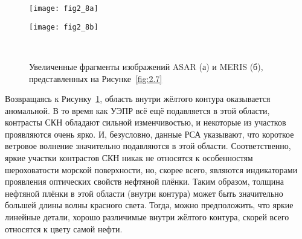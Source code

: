 \begin{figure}[!ht]
   	\centering
	\begin{minipage}{.49\textwidth}
	    \subcaptionbox{\label{fig:2.8a}}
		{\texttt{[image: fig2\_8a]}}
	\end{minipage}
	\hfill
	\begin{minipage}{.49\textwidth}
	    \subcaptionbox{\label{fig:2.8b}}
		{\texttt{[image: fig2\_8b]}}
	\end{minipage}
    \\
    \caption{Увеличенные фрагменты изображений ASAR (а) и MERIS (б), представленных на Рисунке~\ref{fig:2.7}}
    \label{fig:2.8}
\end{figure}


Возвращаясь к Рисунку~\ref{fig:2.8}, область внутри жёлтого контура оказывается аномальной. В то время как УЭПР всё ещё подавляется в этой области, контрасты СКН обладают сильной изменчивостью, и некоторые из участков проявляются очень ярко. И, безусловно, данные РСА указывают, что короткое ветровое волнение значительно подавляются в этой области. Соответственно, яркие участки контрастов СКН никак не относятся к особенностям шероховатости морской поверхности, но, скорее всего, являются индикаторами проявления оптических свойств нефтяной плёнки. Таким образом, толщина нефтяной плёнки в этой области (внутри контура) может быть значительно большей длины волны красного света. Тогда, можно предположить, что яркие линейные детали, хорошо различимые внутри жёлтого контура, скорей всего относятся к цвету самой нефти.



